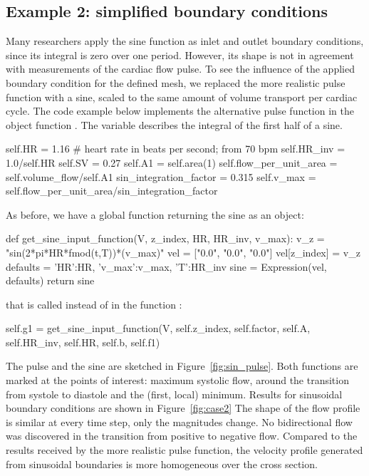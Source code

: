 \subsection{Example 2: simplified boundary conditions}

Many researchers apply the sine function as inlet and outlet boundary
conditions, since its integral is zero over one period. However, its
shape is not in agreement with measurements of the cardiac flow
pulse. To see the influence of the applied boundary condition for the
defined mesh, we replaced the more realistic pulse function with a
sine, scaled to the same amount of volume transport per cardiac
cycle. The code example below implements the alternative pulse
function in the object function . The
variable  describes the integral of the
first half of a sine.
\begin{python}
self.HR = 1.16 # heart rate in beats per second; from 70 bpm
self.HR_inv = 1.0/self.HR
self.SV = 0.27
self.A1 = self.area(1)
self.flow_per_unit_area = self.volume_flow/self.A1
sin_integration_factor = 0.315
self.v_max = self.flow_per_unit_area/sin_integration_factor
\end{python}
As before, we have a global function returning the sine as an object:
\begin{python}
def get_sine_input_function(V, z_index, HR, HR_inv, v_max):
    v_z = "sin(2*pi*HR*fmod(t,T))*(v_max)"
    vel = ["0.0", "0.0", "0.0"]
    vel[z_index] = v_z
    defaults = {'HR':HR, 'v_max':v_max, 'T':HR_inv}
    sine = Expression(vel, defaults)
    return sine
\end{python}
that is called instead of  in the function :
\begin{python}
self.g1 = get_sine_input_function(V, self.z_index, self.factor, self.A,
                                 self.HR_inv, self.HR, self.b, self.f1)
\end{python}

The pulse and the sine are sketched in
Figure~\ref{fig:sin_pulse}. Both functions are marked at the points of
interest: maximum systolic flow, around the transition from systole to
diastole and the (first, local) minimum. Results for sinusoidal
boundary conditions are shown in Figure~\ref{fig:case2} The shape of
the flow profile is similar at every time step, only the magnitudes
change. No bidirectional flow was discovered in the transition from
positive to negative flow. Compared to the results received by the
more realistic pulse function, the velocity profile generated from
sinusoidal boundaries is more homogeneous over the cross section.

